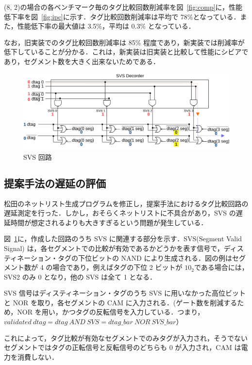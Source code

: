 \documentclass[twocolumn]{jsarticle}
\newcommand{\fig}[1]{{図~\ref{fig:#1}}}
\begin{document}
  (8, 2)の場合の各ベンチマーク毎のタグ比較回数削減率を\fig{comp}に，性能低下率を\fig{ipc}に示す．タグ比較回数削減率は平均で 78\%となっている．また，性能低下率の最大値は 3.5\%，平均は 0.3\% となっている．

  なお，旧実装でのタグ比較回数削減率は 85\% 程度であり，新実装では削減率が低下していることが分かる．これは，新実装は旧実装と比較して性能にシビアであり，セグメント数を大きく出来ないためである．
  \begin{figure}[ht]
    \centering
    \includegraphics[width=0.99\hsize]{svs_decorder.pdf}
    \caption{SVS 回路}  
    \label{fig:svs_decorder}
  \end{figure}

  \subsection{提案手法の遅延の評価}
  松田のネットリスト生成プログラムを修正し，提案手法におけるタグ比較回路の遅延測定を行った．しかし，おそらくネットリストに不具合があり，SVS の遅延時間が想定されるよりも大きすぎるという問題が発生している．

  \fig{svs_decorder}に，作成した回路のうち SVS に関連する部分を示す．SVS(Segment Valid Signal) は，各セグメントでの比較が有効であるかどうかを表す信号で，ディスティネーション・タグの下位ビットの NAND により生成される．図の例はセグメント数が 4 の場合であり，例えばタグの下位 2 ビットが $10_2$である場合には， SVS2 のみ 0 となり，他の SVS は全て 1 となる．

  SVS 信号はディスティネーション・タグのうち SVS に用いなかった高位ビットと NOR を取り，各セグメントの CAM に入力される．(ゲート数を削減するため，NOR を用い，かつタグの反転信号を入力している．つまり，\\$validated \ dtag = dtag \ AND \ SVS = dtag\_bar \ NOR \ SVS\_bar$）
  
  これによって，タグ比較が有効なセグメントでのみタグが入力され，そうでないセグメントではタグの正転信号と反転信号のどちらも 0 が入力され，CAM は電力を消費しない．
\end{document}
